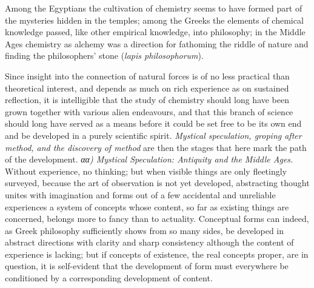 \documentclass[12pt,a4paper]{book}
\begin{document}

Among the Egyptians the cultivation of chemistry seems to have formed part of
the mysteries hidden in the temples; among the Greeks the elements of chemical
knowledge passed, like other empirical knowledge, into philosophy; in the
Middle Ages chemistry as alchemy was a direction for fathoming the riddle of
nature and finding the philosophers' stone (\textit{lapis philosophorum}).

Since insight into the connection of natural forces is of no less practical
than theoretical interest, and depends as much on rich experience as on
sustained reflection, it is intelligible that the study of chemistry should
long have been grown together with various alien endeavours, and that this
branch of science should long have served as a means before it could be set
free to be its own end and be developed in a purely scientific spirit.
\emph{Mystical speculation, groping after method, and the discovery of method}
are then the stages that here mark the path of the development.
\emph{αα) Mystical Speculation: Antiquity and the Middle Ages.} Without
experience, no thinking; but when visible things are only fleetingly surveyed,
because the art of observation is not yet developed, abstracting thought unites
with imagination and forms out of a few accidental and unreliable experiences a
system of concepts whose content, so far as existing things are concerned,
belongs more to fancy than to actuality. Conceptual forms can indeed, as Greek
philosophy sufficiently shows from so many sides, be developed in abstract
directions with clarity and sharp consistency although the content of
experience is lacking; but if concepts of existence, the real concepts proper,
are in question, it is self-evident that the development of form must
everywhere be conditioned by a corresponding development of content.
\end{document}
